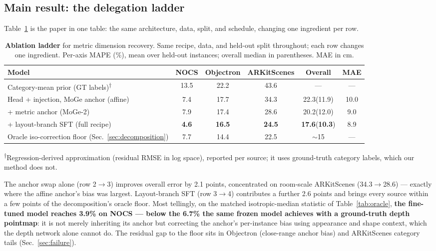 \documentclass[runningheads]{llncs}
\begin{document}
\subsection{Main result: the delegation ladder}
\label{sec:ladder}

Table~\ref{tab:ladder} is the paper in one table: the same architecture, data, split, and
schedule, changing one ingredient per row.

\begin{table}[t]
\centering
\caption{\textbf{Ablation ladder} for metric dimension recovery. Same recipe, data, and
held-out split throughout; each row changes one ingredient. Per-axis MAPE (\%),
mean over held-out instances; overall median in parentheses. MAE in cm.}
\label{tab:ladder}
\setlength{\tabcolsep}{4.5pt}
\begin{tabular}{lccccc}
\toprule
Model & NOCS & Objectron & ARKitScenes & Overall & MAE \\
\midrule
Category-mean prior (GT labels)\textsuperscript{$\dagger$}
                             & 13.5 & 22.2 & 43.6 & ---  & --- \\
\midrule
Head + injection, MoGe anchor (affine)   & 7.4 & 17.7 & 34.3 & 22.3\;(11.9) & 10.0 \\
\;\;+ metric anchor (MoGe-2)             & 7.9 & 17.4 & 28.6 & 20.2\;(12.0) & 9.0 \\
\;\;+ layout-branch SFT (full recipe)    & \textbf{4.6} & \textbf{16.5} & \textbf{24.5}
                                         & \textbf{17.6}\;(\textbf{10.3}) & 8.9 \\
\midrule
Oracle iso-correction floor (Sec.~\ref{sec:decomposition})
                             & 7.7 & 14.4 & 22.5 & $\sim$15 & --- \\
\bottomrule
\end{tabular}
\vspace{1mm}
{\small \textsuperscript{$\dagger$}Regression-derived approximation (residual RMSE in
log space), reported per source; it uses ground-truth category labels, which our method
does not.}
\end{table}

The anchor swap alone (row 2$\to$3) improves overall error by 2.1 points, concentrated on
room-scale ARKitScenes (34.3$\to$28.6) --- exactly where the affine anchor's bias was
largest. Layout-branch SFT (row 3$\to$4) contributes a further 2.6 points and brings every
source within a few points of the decomposition's oracle floor. Most tellingly, on the
matched isotropic-median statistic of Table~\ref{tab:oracle}, \textbf{the fine-tuned
model reaches 3.9\% on NOCS --- below the 6.7\% the same frozen model achieves with a
ground-truth depth pointmap}: it is not merely inheriting its anchor but correcting the
anchor's per-instance bias using appearance and shape context, which the depth network
alone cannot do. The residual gap to the floor sits in Objectron (close-range anchor
bias) and ARKitScenes category tails (Sec.~\ref{sec:failure}).
\end{document}
